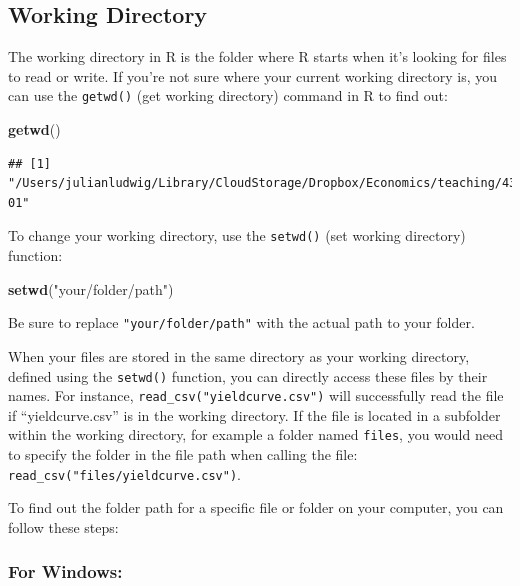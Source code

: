 \documentclass[
]{book}
\newenvironment{Shaded}{\begin{snugshade}}{\end{snugshade}}
\newcommand{\FunctionTok}[1]{\textcolor[rgb]{0.13,0.29,0.53}{\textbf{#1}}}
\newcommand{\NormalTok}[1]{#1}
\newcommand{\StringTok}[1]{\textcolor[rgb]{0.31,0.60,0.02}{#1}}
\begin{document}
\hypertarget{working-directory}{%
\subsection{Working Directory}\label{working-directory}}

The working directory in R is the folder where R starts when it's looking for files to read or write. If you're not sure where your current working directory is, you can use the \texttt{getwd()} (get working directory) command in R to find out:

\begin{Shaded}
\begin{Highlighting}[]
\FunctionTok{getwd}\NormalTok{()}
\end{Highlighting}
\end{Shaded}

\begin{verbatim}
## [1] "/Users/julianludwig/Library/CloudStorage/Dropbox/Economics/teaching/4300_2023/module-01"
\end{verbatim}

To change your working directory, use the \texttt{setwd()} (set working directory) function:

\begin{Shaded}
\begin{Highlighting}[]
\FunctionTok{setwd}\NormalTok{(}\StringTok{"your/folder/path"}\NormalTok{)}
\end{Highlighting}
\end{Shaded}

Be sure to replace \texttt{"your/folder/path"} with the actual path to your folder.

When your files are stored in the same directory as your working directory, defined using the \texttt{setwd()} function, you can directly access these files by their names. For instance, \texttt{read\_csv("yieldcurve.csv")} will successfully read the file if ``yieldcurve.csv'' is in the working directory. If the file is located in a subfolder within the working directory, for example a folder named \texttt{files}, you would need to specify the folder in the file path when calling the file: \texttt{read\_csv("files/yieldcurve.csv")}.

To find out the folder path for a specific file or folder on your computer, you can follow these steps:

\hypertarget{for-windows-1}{%
\subsubsection*{For Windows:}\label{for-windows-1}}
\end{document}
